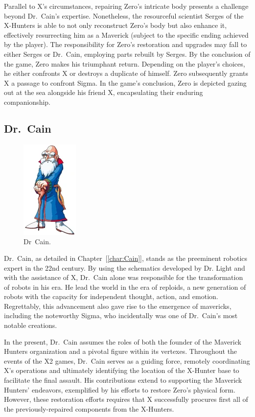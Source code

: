 Parallel to X's circumstances, repairing Zero's intricate body presents a challenge beyond Dr.~Cain's expertise. Nonetheless, the resourceful scientist Serges of the X-Hunters is able to not only reconstruct Zero's body but also enhance it, effectively resurrecting him as a Maverick\cite{wayback:X2_resources} (subject to the specific ending achieved by the player). The responsibility for Zero's restoration and upgrades may fall to either Serges or Dr.~Cain, employing parts rebuilt by Serges. By the conclusion of the game, Zero makes his triumphant return. Depending on the player's choices, he either confronts X or destroys a duplicate of himself. Zero subsequently grants X a passage to confront Sigma. In the game's conclusion, Zero is depicted gazing out at the sea alongside his friend X, encapsulating their enduring companionship.

\subsection{Dr.~Cain}
\begin{figure}[htp]
	\centering
	\includegraphics[height=\portraitsize]{figures/Characters/Char_Cain_X2.png}
	\caption{Dr~Cain.}
\end{figure}
Dr.~Cain, as detailed in Chapter~[\ref{char:Cain}], stands as the preeminent robotics expert in the 22nd century\cite{Xcoll1:Manual_X2}. By using the schematics developed by Dr. Light and with the assistance of X, Dr.~Cain alone was responsible for the transformation of robots in his era. He lead the world in the era of reploids, a new generation of robots  with the capacity for independent thought, action, and emotion. Regrettably, this advancement also gave rise to the emergence of mavericks, including the noteworthy Sigma, who incidentally was one of Dr.~Cain's most notable creations.

In the present, Dr.~Cain assumes the roles of both the founder of the Maverick Hunters organization and a pivotal figure within its vertexes. Throughout the events of the X2 games, Dr.~Cain serves as a guiding force, remotely coordinating X's operations and ultimately identifying the location of the X-Hunter base to facilitate the final assault. His contributions extend to supporting the Maverick Hunters' endeavors, exemplified by his efforts to restore Zero's physical form. However, these restoration efforts requires that X successfully procures  first all of the previously-repaired components from the X-Hunters.

